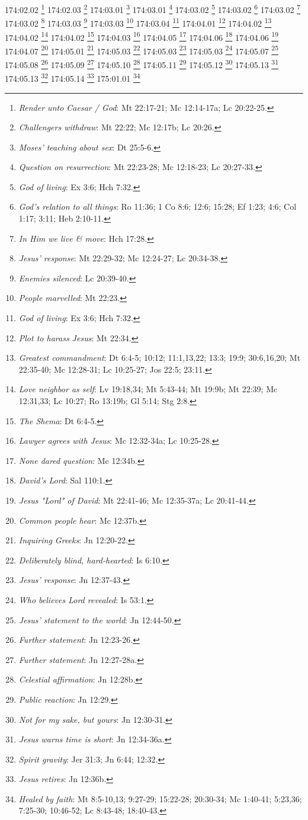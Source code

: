 174:02.02 \footnote{\textit{Render unto Caesar / God}: Mt 22:17-21; Mc 12:14-17a; Lc 20:22-25.}
174:02.03 \footnote{\textit{Challengers withdraw}: Mt 22:22; Mc 12:17b; Lc 20:26.}
174:03.01 \footnote{\textit{Moses' teaching about sex}: Dt 25:5-6.}
174:03.01 \footnote{\textit{Question on resurrection}: Mt 22:23-28; Mc 12:18-23; Lc 20:27-33.}
174:03.02 \footnote{\textit{God of living}: Ex 3:6; Hch 7:32.}
174:03.02 \footnote{\textit{God's relation to all things}: Ro 11:36; 1 Co 8:6; 12:6; 15:28; Ef 1:23; 4:6; Col 1:17; 3:11; Heb 2:10-11.}
174:03.02 \footnote{\textit{In Him we live & move}: Hch 17:28.}
174:03.02 \footnote{\textit{Jesus' response}: Mt 22:29-32; Mc 12:24-27; Lc 20:34-38.}
174:03.03 \footnote{\textit{Enemies silenced}: Lc 20:39-40.}
174:03.03 \footnote{\textit{People marvelled}: Mt 22:23.}
174:03.04 \footnote{\textit{God of living}: Ex 3:6; Hch 7:32.}
174:04.01 \footnote{\textit{Plot to harass Jesus}: Mt 22:34.}
174:04.02 \footnote{\textit{Greatest commandment}: Dt 6:4-5; 10:12; 11:1,13,22; 13:3; 19:9; 30:6,16,20; Mt 22:35-40; Mc 12:28-31; Lc 10:25-27; Jos 22:5; 23:11.}
174:04.02 \footnote{\textit{Love neighbor as self}: Lv 19:18,34; Mt 5:43-44; Mt 19:9b; Mt 22:39; Mc 12:31,33; Lc 10:27; Ro 13:19b; Gl 5:14; Stg 2:8.}
174:04.02 \footnote{\textit{The Shema}: Dt 6:4-5.}
174:04.03 \footnote{\textit{Lawyer agrees with Jesus}: Mc 12:32-34a; Lc 10:25-28.}
174:04.05 \footnote{\textit{None dared question}: Mc 12:34b.}
174:04.06 \footnote{\textit{David's Lord}: Sal 110:1.}
174:04.06 \footnote{\textit{Jesus "Lord" of David}: Mt 22:41-46; Mc 12:35-37a; Lc 20:41-44.}
174:04.07 \footnote{\textit{Common people hear}: Mc 12:37b.}
174:05.01 \footnote{\textit{Inquiring Greeks}: Jn 12:20-22.}
174:05.03 \footnote{\textit{Deliberately blind, hard-hearted}: Is 6:10.}
174:05.03 \footnote{\textit{Jesus' response}: Jn 12:37-43.}
174:05.03 \footnote{\textit{Who believes Lord revealed}: Is 53:1.}
174:05.07 \footnote{\textit{Jesus' statement to the world}: Jn 12:44-50.}
174:05.08 \footnote{\textit{Further statement}: Jn 12:23-26.}
174:05.09 \footnote{\textit{Further statement}: Jn 12:27-28a.}
174:05.10 \footnote{\textit{Celestial affirmation}: Jn 12:28b.}
174:05.11 \footnote{\textit{Public reaction}: Jn 12:29.}
174:05.12 \footnote{\textit{Not for my sake, but yours}: Jn 12:30-31.}
174:05.13 \footnote{\textit{Jesus warns time is short}: Jn 12:34-36a.}
174:05.13 \footnote{\textit{Spirit gravity}: Jer 31:3; Jn 6:44; 12:32.}
174:05.14 \footnote{\textit{Jesus retires}: Jn 12:36b.}
175:01.01 \footnote{\textit{Healed by faith}: Mt 8:5-10,13; 9:27-29; 15:22-28; 20:30-34; Mc 1:40-41; 5:23,36; 7:25-30; 10:46-52; Lc 8:43-48; 18:40-43.}
